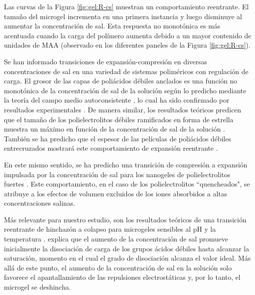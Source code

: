 Las curvas de la Figura \ref{fig:gel:R-cs} muestran un comportamiento reentrante. El tama\~no del microgel incrementa en una primera instancia y luego disminuye al aumentar la concentraci\'on de sal.
Esta respuesta no monot\'onica es m\'as acentuada cuando la carga del pol\'imero aumenta debido a un mayor contenido de unidades de MAA (observado en los diferentes paneles de la Figura \ref{fig:gel:R-cs}).

Se han informado transiciones de expansi\'on-compresi\'on en diversas concentraciones de sal en una variedad de sistemas polim\'ericos con regulaci\'on de carga.
El grosor de las capas de poli\'acidos d\'ebiles anclados es una funci\'on no monot\'onica de la concentraci\'on de sal de la soluci\'on seg\'un lo predicho mediante la teor\'ia del campo medio autoconsistente \cite{Israels1994, Lyatskaya1995, Zhulina1995, Gong2007}, lo cual ha sido confirmado por resultados experimentales \cite{wu2007behavior}.
De manera similar, los resultados te\'oricos predicen que el tama\~no de los polielectrolitos d\'ebiles ramificados en forma de estrella muestra un m\'aximo en funci\'on de la concentraci\'on de sal de la soluci\'on \cite{Borisov1998, KleinWolterink2002}.
Tambi\'en se ha predicho que el espesor de las pel\'iculas de poli\'acidos d\'ebiles entrecruzados mostrar\'a este comportamiento de expansi\'on reentrante \cite{Longo2014JCP}.






En este mismo sentido, se ha predicho una transici\'on de compresi\'on a expansi\'on impulsada por la concentraci\'on de sal para los nanogeles de polielectrolitos fuertes \cite{jha2012understanding}. Este comportamiento, en el caso de los polielectrolitos ``quencheados", se atribuye a los efectos de volumen excluidos de los iones absorbidos a altas concentraciones salinas.

M\'as relevante para nuestro estudio, son los resultados te\'oricos de una transici\'on reentrante de hinchaz\'on a colapso para microgeles sensibles al pH y la temperatura \cite{polotsky2013collapse}. \citet{polotsky2013collapse} explica que el aumento de la concentraci\'on de sal promueve inicialmente la disociaci\'on de carga de los grupos \'acidos d\'ebiles hasta alcanzar la saturaci\'on, momento en el cual el grado de disociaci\'on alcanza el valor ideal. M\'as all\'a de este punto, el aumento de la concentraci\'on de sal en la soluci\'on solo favorece el apantallamiento de las repulsiones electrost\'aticas y, por lo tanto, el microgel se deshincha.

